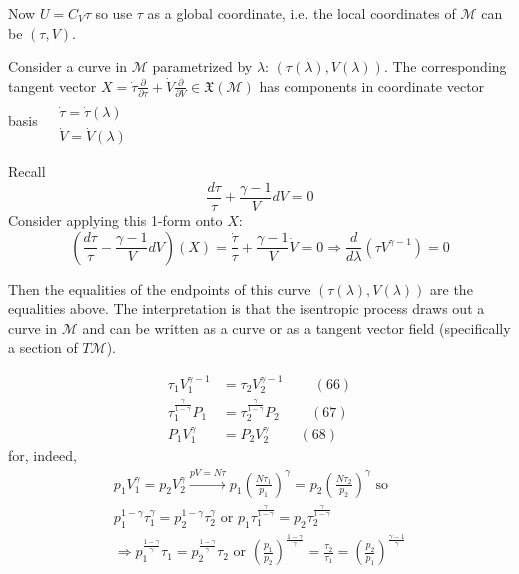 \documentclass[twoside]{amsart}
\theoremstyle{plain}
\theoremstyle{definition}
\begin{document}
Now $U = C_V \tau$ so use $\tau$ as a global coordinate, i.e. the local coordinates of $\mathcal{M}$ can be $(\tau,V)$.  

Consider a curve in $\mathcal{M}$ parametrized by $\lambda$: $(\tau(\lambda), V(\lambda))$.  The corresponding tangent vector $X = \dot{\tau} \frac{ \partial }{ \partial \tau } + \dot{V} \frac{ \partial }{ \partial V} \in \mathfrak{X}(\mathcal{M})$ has components in coordinate vector basis $\begin{aligned} & \quad \\
  & \dot{\tau} = \dot{\tau}(\lambda) \\
  & \dot{V} = \dot{V}(\lambda) \end{aligned}$

Recall
\[
\frac{d\tau}{\tau} + \frac{\gamma- 1}{V} dV =0 
\]
Consider applying this 1-form onto $X$:
\[
\left( \frac{d\tau}{\tau} - \frac{ \gamma - 1}{V}dV \right)(X) = \frac{ \dot{\tau}}{\tau} + \frac{\gamma -1}{ V} \dot{V} = 0 \Longrightarrow \frac{d}{d\lambda}(\tau V^{\gamma-1}) = 0 
\]

Then the equalities of the endpoints of this curve $(\tau(\lambda),V(\lambda))$ are the equalities above.  The interpretation is that the isentropic process draws out a curve in $\mathcal{M}$ and can be written as a curve or as a tangent vector field (specifically a section of $T\mathcal{M}$).  


\begin{align}
  \tau_1 V_1^{\gamma -1 } & = \tau_2 V_2^{\gamma -1 } \quad \quad \, (66) \\
  \tau_1^{ \frac{\gamma}{1-\gamma}} P_1 & = \tau_2^{\frac{\gamma}{1- \gamma}} P_2 \quad \quad \, (67) \\ 
P_1 V_1^{\gamma}   & = P_2 V_2^{\gamma} \quad \quad \, (68)
\end{align}
for, indeed, 
\[
\begin{gathered}
  p_1 V_1^{\gamma} = p_2 V_2^{\gamma} \xrightarrow{ pV=N\tau} p_1 \left( \frac{ N\tau_1}{p_1} \right)^{\gamma} = p_2 \left( \frac{ N\tau_2}{p_2} \right)^{\gamma} \text{ so } \\
  p_1^{1-\gamma} \tau_1^{\gamma} = p_2^{1-\gamma} \tau_2^{\gamma} \text{ or } p_1 \tau_1^{\frac{ \gamma}{1- \gamma} } = p_2 \tau_2^{\frac{ \gamma}{1- \gamma} } \\
\Longrightarrow  p_1^{\frac{1-\gamma}{\gamma} }\tau_1 = p_2^{\frac{1-\gamma}{\gamma} }\tau_2 \text{ or } \left( \frac{p_1}{p_2} \right)^{\frac{1-\gamma}{\gamma} } = \frac{\tau_2}{\tau_1} = \left( \frac{p_2}{p_1} \right)^{\frac{\gamma-1}{\gamma}}
\end{gathered}
\]
\end{document}
